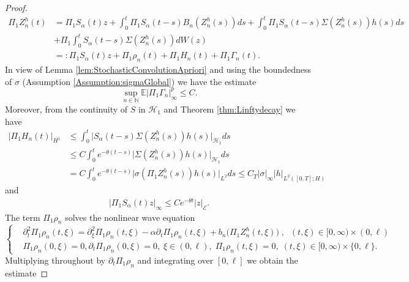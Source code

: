 \documentclass[10pt, reqno]{amsart}
\newcommand{\N}{\mathbb{N}}
\newcommand{\ex}{\mathbb{E}}
\newcommand{\h}{\mathcal{H}}
\newcommand{\e}{\mathcal{E}}
\theoremstyle{definition}
\numberwithin{lem}{section}
\numberwithin{cor}{section}
\numberwithin{prop}{section}
\numberwithin{thm}{section}
\numberwithin{dfn}{section}
\begin{document}
\begin{proof}
    	   
    	   \begin{equation*}
    	   \begin{aligned}
    	   \Pi_1Z_{n}^{h}(t)&=\Pi_1S_\alpha(t)z+\int_{0}^{t}\Pi_1S_\alpha(t-s)B_n(Z_{n}^{h}(s))ds+\int_{0}^{t}\Pi_1S_\alpha(t-s)\Sigma(Z_{n}^{h}(s))h(s)ds\\&+\Pi_1\int_{0}^{t}S_\alpha(t-s)\Sigma(Z_{n}^{h}(s))dW(z)\\&
    	   =:\Pi_1S_\alpha(t)z+\Pi_1\rho_{n}(t)+\Pi_1H_{n}(t)+\Pi_1\Gamma_{n}(t).
    	   \end{aligned}
    	   \end{equation*}
    	  In view of Lemma \ref{lem:StochasticConvolutionApriori} and using the boundedness of $\sigma$ (Assumption \ref{Assumption:sigmaGlobal}) we have the estimate
    	   \begin{equation}\label{convobnd}
    	   \sup_{n\in\N}\ex|\Pi_1\Gamma_{n}|^p_{\infty}\leq C.
    	   \end{equation}
    	   Moreover, from the continuity of $S$ in $\h_{1}$ and Theorem \ref{thm:Linftydecay} we have 
    	   \begin{equation}\label{Ubnd}
    	   \begin{aligned}
    	   |\Pi_1H_{n}(t)|_{H^1}&\leq \int_{0}^{t}\big| S_\alpha(t-s)\Sigma(Z_{n}^{h}(s))h(s)   \big|_{\h_1}ds%
    	   \\&
    	   \leq C\int_{0}^{t}e^{-\theta(t-s)}\big|\Sigma(Z_{n}^{h}(s))h(s)   \big|_{\h_1}ds\\&=C\int_{0}^{t}e^{-\theta(t-s)}\big|\sigma(\Pi_1Z_{n}^{h}(s))h(s)   \big|_{L^2}ds\leq C_T|\sigma|_{\infty}|h|_{L^2([0,T];H)}
    	    \end{aligned}
    	   \end{equation}
    	 and 
    	  \begin{equation}\label{zbnd}
    	 \begin{aligned}
    	    |\Pi_1S_\alpha(t)z|_{\infty}\leq Ce^{-\theta t}|z|_{\e}.
    	 \end{aligned}
    	 \end{equation}
    	   The term $\Pi_1\rho_{n}$ solves the nonlinear wave equation
    	    \begin{equation*}\label{rhoeq}
    	   \left\{\begin{aligned}
    	   &\partial_t^2\Pi_1 \rho_{n}(t,\xi)=
    	   \partial_\xi^2 \Pi_1\rho_{n}(t,\xi)-\alpha\partial_t\Pi_1 \rho_{n}(t,\xi) +b_n\big(\Pi_1 Z_{n}^{h}(t,\xi)\big)\;,\;\;(t,\xi)\in [0,\infty)\times(0,\ell)
    	   \\&\Pi_1\rho_{n}(0,\xi)=0, \partial_t \Pi_1\rho_{n}(0,\xi)=0,\;  \xi\in(0,\ell),\; \Pi_1\rho_{n}(t,\xi)=0,\; (t,\xi)\in[0,\infty)\times\{0,\ell\}.
    	   \end{aligned}\right.
    	   \end{equation*}
    	   Multiplying throughout by $\partial_t\Pi_1 \rho_{n}$ and integrating over $[0,\ell]$ we obtain the estimate
    	   

\end{proof}
\end{document}
